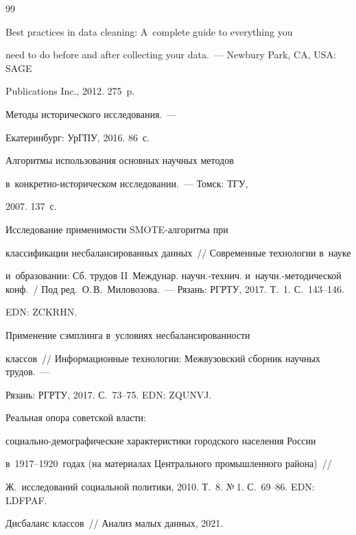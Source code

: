 {{\begin{thebibliography}{99}


   Best practices in data cleaning: A~complete guide to everything you 


need to do before and after collecting your data.~--- Newbury Park, CA, USA: SAGE 


Publications Inc., 2012. 275~p.




   Методы исторического исследования.~--- 


Екатеринбург: УрГПУ, 2016. 86~с.




   Алгоритмы использования основных научных методов  


в~кон\-крет\-но-ис\-то\-ри\-че\-ском исследовании.~--- Томск: ТГУ, 


2007. 137~с.




   Исследование применимости SMOTE-ал\-го\-рит\-ма при 


классификации несбалансированных данных~/\!\!/ Современные технологии в~науке 


и~образовании: Сб. трудов II~Междунар. научн.-тех\-нич. и~научн.-ме\-то\-ди\-че\-ской конф.~/ Под ред.\ О.\,В.~Миловозова.~--- Рязань: РГРТУ, 2017. Т.~1. С.~143--146.


  EDN: ZCKRHN.




   Применение сэмплинга в~условиях несбалансированности 


классов~/\!\!/ Информационные технологии: Межвузовский сборник научных трудов.~--- 


Рязань: РГРТУ, 2017. С.~73--75. EDN: ZQUNVJ.




   Реальная опора советской власти:  


со\-ци\-аль\-но-де\-мо\-гра\-фи\-че\-ские характеристики городского населения России 


в~1917--1920~годах (на материалах Центрального промышленного района)~/\!\!/ 


Ж.~исследований социальной политики, 2010. Т.~8. №\,1. С.~69--86. EDN: LDFPAF.




   Дисбаланс классов~/\!\!/ Анализ малых данных, 2021. {\sf 


}
\end{thebibliography}}}
